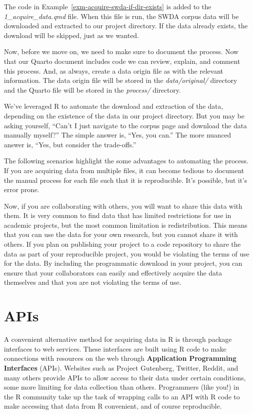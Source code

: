 \documentclass[
  letterpaper,
]{latex/krantz}
\theoremstyle{definition}
\theoremstyle{remark}
\begin{document}
The code in Example~\ref{exm-acquire-swda-if-dir-exists} is added to the
\emph{1\_acquire\_data.qmd} file. When this file is run, the SWDA corpus
data will be downloaded and extracted to our project directory. If the
data already exists, the download will be skipped, just as we wanted.

Now, before we move on, we need to make sure to document the process.
Now that our Quarto document includes code we can review, explain, and
comment this process. And, as always, create a data origin file as with
the relevant information. The data origin file will be stored in the
\emph{data/original/} directory and the Quarto file will be stored in
the \emph{process/} directory.

We've leveraged R to automate the download and extraction of the data,
depending on the existence of the data in our project directory. But you
may be asking yourself, ``Can't I just navigate to the corpus page and
download the data manually myself?'' The simple answer is, ``Yes, you
can.'' The more nuanced answer is, ``Yes, but consider the trade-offs.''

The following scenarios highlight the some advantages to automating the
process. If you are acquiring data from multiple files, it can become
tedious to document the manual process for each file such that it is
reproducible. It's possible, but it's error prone.

Now, if you are collaborating with others, you will want to share this
data with them. It is very common to find data that has limited
restrictions for use in academic projects, but the most common
limitation is redistribution. This means that you can use the data for
your own research, but you cannot share it with others. If you plan on
publishing your project to a code repository to share the data as part
of your reproducible project, you would be violating the terms of use
for the data. By including the programmatic download in your project,
you can ensure that your collaborators can easily and effectively
acquire the data themselves and that you are not violating the terms of
use.

\section{APIs}\label{sec-apis}

A convenient alternative method for acquiring data in R is through
package interfaces to web services. These interfaces are built using R
code to make connections with resources on the web through
\textbf{Application Programming Interfaces} (APIs). Websites such as
Project Gutenberg, Twitter, Reddit, and many others provide APIs to
allow access to their data under certain conditions, some more limiting
for data collection than others. Programmers (like you!) in the R
community take up the task of wrapping calls to an API with R code to
make accessing that data from R convenient, and of course reproducible.
\end{document}
